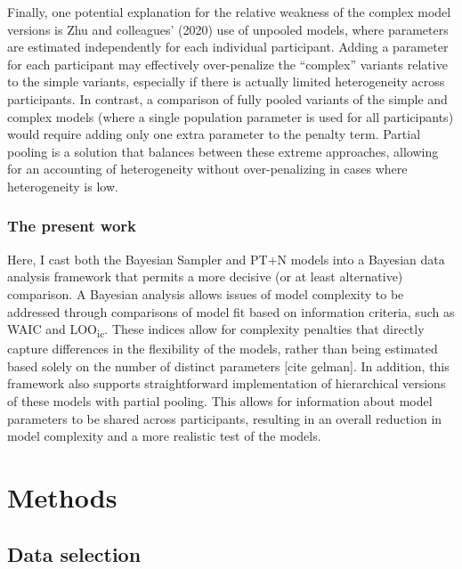 \documentclass{article}
\begin{document}
Finally, one potential explanation for the relative weakness of the
complex model versions is Zhu and colleagues' (2020) use of unpooled
models, where parameters are estimated independently for each individual
participant. Adding a parameter for each participant may effectively
over-penalize the ``complex'' variants relative to the simple variants,
especially if there is actually limited heterogeneity across
participants. In contrast, a comparison of fully pooled variants of the
simple and complex models (where a single population parameter is used
for all participants) would require adding only one extra parameter to
the penalty term. Partial pooling is a solution that balances between
these extreme approaches, allowing for an accounting of heterogeneity
without over-penalizing in cases where heterogeneity is low.

\hypertarget{the-present-work}{%
\subsubsection{The present work}\label{the-present-work}}

Here, I cast both the Bayesian Sampler and PT+N models into a Bayesian
data analysis framework that permits a more decisive (or at least
alternative) comparison. A Bayesian analysis allows issues of model
complexity to be addressed through comparisons of model fit based on
information criteria, such as WAIC and LOO\textsubscript{ic}. These
indices allow for complexity penalties that directly capture differences
in the flexibility of the models, rather than being estimated based
solely on the number of distinct parameters {[}cite gelman{]}. In
addition, this framework also supports straightforward implementation of
hierarchical versions of these models with partial pooling. This allows
for information about model parameters to be shared across participants,
resulting in an overall reduction in model complexity and a more
realistic test of the models.

\hypertarget{methods}{%
\section{Methods}\label{methods}}

\hypertarget{data-selection}{%
\subsection{Data selection}\label{data-selection}}
\end{document}
